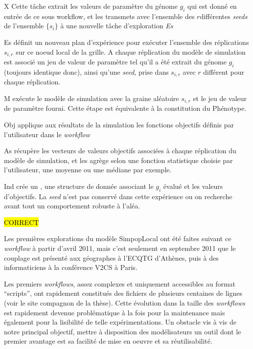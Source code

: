 \begin{myitemize}

\item[X] Cette tâche extrait les valeurs de paramètre du génome $g_i$ qui est donné en entrée de ce sous workflow, et les transmets avec l'ensemble des $r$différentes \textit{seeds} de l'ensemble $\{s_i\}$ à une nouvelle tâche d'exploration \textit{Es}

\item[Es] définit un nouveau plan d'expérience pour exécuter l'ensemble des réplications $s_{i,r}$ sur ce noeud local de la grille. A chaque réplication du modèle de simulation est associé un jeu de valeur de paramètre tel qu'il a été extrait du génome $g_i$ (toujours identique donc), ainsi qu'une \textit{seed}, prise dans $s_{i,r}$ avec $r$ différent pour chaque réplication.

\item[M] exécute le modèle de simulation avec la graine aléatoire $s_{i,r}$ et le jeu de valeur de paramètre fourni. Cette étape est équivalente à la constitution du Phénotype.

\item[Obj] applique aux résultats de la simulation les fonctions objectifs définis par l'utilisateur dans le \textit{workflow}

\item[As] récupère les vecteurs de valeurs objectifs associées à chaque réplication du modèle de simulation, et les agrège selon une fonction statistique choisie par l'utilisateur, une moyenne ou une médiane par exemple.

\item[Ind] crée un , une structure de donnée associant le  $g_i$ évalué et les valeurs d'objectifs. La \textit{seed} n'est pas conservé dans cette expérience ou on recherche avant tout un comportement robuste à l'aléa.

\end{myitemize}

\hl{CORRECT}

Les premières explorations du modèle SimpopLocal ont été faites suivant ce \textit{workflow} à partir d'avril 2011, mais c'est seulement en septembre 2011 que le couplage est présenté aux géographes à l'ECQTG d'Athènes, puis à des informaticiens à la conférence V2CS à Paris.

Les premiers \textit{workflows}, assez complexes et uniquement accessibles au format \enquote{scripts}, ont rapidement constitués des fichiers de plusieurs centaines de lignes (voir le site compagnon de la thèse). Cette évolution dans la taille des \textit{workflows} est rapidement devenue problématique à la fois pour la maintenance mais également pour la lisibilité de telle expérimentations. Un obstacle vis à vis de notre principal objectif, mettre à disposition des modélisateurs un outil dont le premier avantage est sa facilité de mise en oeuvre et sa réutilisabilité.

